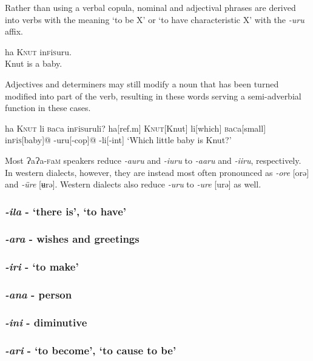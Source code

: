\documentclass[a4paper,10pt,twoside,openright]{memoir}
\newcommand{\lang}{{\bigglot}a{\bigglot}a-\textsc{f}a\textsc{m}}
\newcommand{\bripa}[1]{[#1]}
\newcommand{\bigglot}{Ɂ}
\newcommand{\famwordold}[5]{#1\textsc{#2}#3\textsc{#4}#5}
\begin{document}
Rather than using a verbal copula, nominal and adjectival phrases are derived into verbs with the meaning `to be X' or `to have characteristic X' with the \emph{-uru} affix. 

\ex
ha \textsc{Knut} \famwordold{in}{f}{i}{s}{uru}.\\
Knut is a baby.
\xe

Adjectives and determiners may still modify a noun that has been turned modified into part of the verb, resulting in these words serving a semi-adverbial function in these cases. 

\ex
\begingl
\glpreamble
ha \textsc{Knut} li \famwordold{}{b}{a}{c}{a} \famwordold{in}{f}{i}{s}{uruli}?
\endpreamble
ha[\sc ref.m]
\textsc{Knut}[Knut]
li[which]
\famwordold{}{b}{a}{c}{a}[small]
\famwordold{in}{f}{i}{s}{}[baby]@
-uru[\sc -cop]@
-li[\sc -int]
\glft
`Which little baby is Knut?'
\endgl
\xe

Most \lang{} speakers reduce \textit{-auru} and \textit{-iuru} to \textit{-aaru} and \textit{-iiru}, respectively. In western dialects, however, they are instead most often pronounced as \textit{-ore} \bripa{orə} and \textit{-üre} \bripa{ʉrə}. Western dialects also reduce \textit{-uru} to \textit{-ure} \bripa{urə} as well.

\subsubsection{\emph{-ila} - `there is', `to have'}

\subsubsection{\emph{-ara} - wishes and greetings}

\subsubsection{\emph{-iri} - `to make'}

\subsubsection{\emph{-ana} - person}

\subsubsection{\emph{-ini} - diminutive}

\subsubsection{\emph{-ari} - `to become', `to cause to be'}
\end{document}
